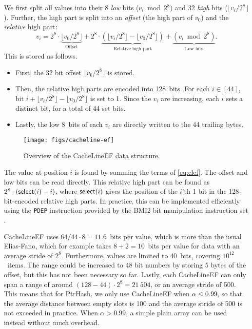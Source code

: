 \documentclass[a4paper,UKenglish,cleveref,thm-restate]{lipics-v2021}
\begin{document}
We first split all values into their 8 \emph{low} bits (\(v_i \bmod 2^8\)) and 32
\emph{high} bits (\(\lfloor v_i/2^8\rfloor\)). Further, the high part is split into an
\emph{offset} (the high part of \(v_0\)) and the \emph{relative} high part:
\begin{equation}
v_i =
2^8\cdot\underbrace{\lfloor v_0/2^8\rfloor}_{\text{Offset}} +
2^8\cdot \underbrace{\left(\lfloor v_i/2^8\rfloor - \lfloor
v_0/2^8\rfloor\right)}_{\text{Relative high part}}
+\underbrace{(v_i\bmod 2^8)}_{\text{Low bits}}.
\label{eq:clef}
\end{equation}
This is stored as follows.
\begin{itemize}
\item First, the 32 bit offset \(\lfloor v_0/2^8\rfloor\) is stored.
\item Then, the relative high parts are encoded into 128~bits. For each \(i\in[44]\), bit \(i + \lfloor
  v_i/2^8\rfloor - \lfloor v_0/2^8\rfloor\) is set to 1.
Since the \(v_i\) are increasing, each \(i\) sets a distinct bit, for a total of 44 set bits.
\item Lastly, the low 8~bits of each \(v_i\) are directly written to the 44 trailing bytes.
\end{itemize}

\begin{figure}[t]
\centering
\texttt{[image: figs/cacheline-ef]}
\caption{\label{cacheline-ef}Overview of the CacheLineEF data structure.}
\end{figure}

 The value at position \(i\) is found by summing the terms of
\cref{eq:clef}. The offset and low bits can be read directly.
This relative high part can be found as \(2^8\cdot(\mathsf{select}(i)-i)\), where \(\mathsf{select}(i)\) gives
the position of the \(i\)'th 1 bit in the 128-bit-encoded relative high parts. In practice, this can be implemented
efficiently using the \texttt{PDEP} instruction provided by the BMI2 bit manipulation
instruction set \cite{fast-select}.

 CacheLineEF uses \(64/44\cdot 8 = 11.6\)~bits per value, which is
more than the usual Elias-Fano, which for example takes \(8+2=10\)~bits per value for data
with an average stride of \(2^8\).
Furthermore, values are limited to 40~bits, covering \(10^{12}\)~items.
The range could be increased to 48 bit numbers by storing 5 bytes of the
offset, but this has not been necessary so far.
Lastly, each CacheLineEF can only span a range of around \((128-44)\cdot 2^8 =
21\ 504\), or an average stride of 500.
This means that for PtrHash, we only use CacheLineEF when \(\alpha\leq 0.99\), so that the
average distance between empty slots is 100 and the average stride of 500 is
not exceeded in practice. When \(\alpha > 0.99\), a simple plain array can be used
instead without much overhead.
\end{document}
